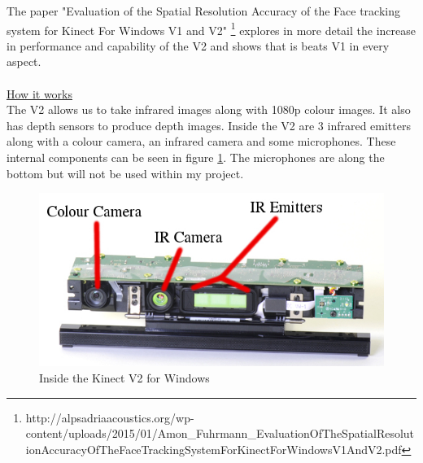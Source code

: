 \documentclass[11pt]{report}
\begin{document}
The paper "Evaluation of the Spatial Resolution Accuracy of the Face 
tracking system for Kinect For Windows V1 and V2"
\footnote{http://alpsadriaacoustics.org/wp-content/uploads/2015/01/Amon\_Fuhrmann\_EvaluationOfTheSpatialResolutionAccuracyOfTheFaceTrackingSystemForKinectForWindowsV1AndV2.pdf}
explores in more detail the increase in performance and capability
of the V2 and shows that is beats V1 in every aspect. 
\\ \\
\underline{How it works} \\ 
The V2 allows us to take infrared images along with 1080p colour images. It 
also has depth sensors to produce depth images. Inside the V2 are 3 infrared
emitters along with a colour camera, an infrared camera and some microphones.
These internal components can be seen in figure \ref{kinectinternal}. The
microphones are along the bottom but will not be used within my project. 
\begin{center}
	\begin{figure}[H]
		\begin{center}
			\includegraphics[scale=0.5]{pics/kinectinternal}
				\caption{Inside the Kinect V2 for Windows}
				\label{kinectinternal}
		\end{center}
	\end{figure}
\end{center}
\end{document}
